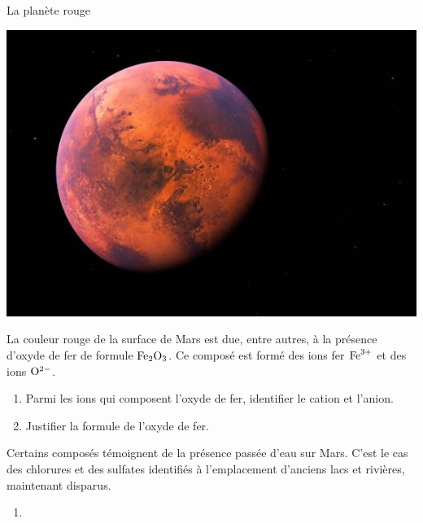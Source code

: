 \documentclass[12pt,a4paper]{article}
\newcounter{memory}
\begin{document}
\begin{exo}{La planète rouge}

\begin{multicols}{2}
\begin{center}
\includegraphics[scale=0.4]{images/mars.jpg}
\end{center}

La couleur rouge de la surface de Mars est due, entre autres, à la présence d'oxyde de fer de formule $\mathrm{Fe}_\mathrm{2}\mathrm{O}_\mathrm{3}$.
Ce composé est formé des ions fer $\mathrm{Fe}^\mathrm{3+}$ et des ions $\mathrm{O}^\mathrm{2-}$.

\begin{enumerate}
\item \app{} 

Parmi les ions qui composent l'oxyde de fer, identifier le cation et l'anion.

\item \anarai{} 

\com{} 

Justifier la formule de l'oxyde de fer.
\setcounter{memory}{\theenumi}
\end{enumerate}
\end{multicols}

Certains composés témoignent de la présence passée d'eau sur Mars.
C'est le cas des chlorures et des sulfates identifiés à l'emplacement d'anciens lacs et rivières, maintenant disparus.

\begin{multicols}{2}
\begin{enumerate}
\setcounter{enumi}{\thememory}
\item \anarai{} 


\end{enumerate}
\end{multicols}
\end{exo}
\end{document}
